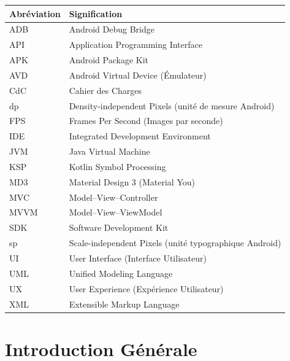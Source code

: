 \documentclass[12pt,a4paper]{report}
\begin{document}
\begin{center}
\begin{tabular}{p{3cm} p{11.5cm}}
\toprule
\textbf{Abr\'eviation} & \textbf{Signification} \\
\midrule
ADB   & Android Debug Bridge \\
API   & Application Programming Interface \\
APK   & Android Package Kit \\
AVD   & Android Virtual Device (\'Emulateur) \\
CdC   & Cahier des Charges \\
dp    & Density-independent Pixels (unit\'e de mesure Android) \\
FPS   & Frames Per Second (Images par seconde) \\
IDE   & Integrated Development Environment \\
JVM   & Java Virtual Machine \\
KSP   & Kotlin Symbol Processing \\
MD3   & Material Design 3 (Material You) \\
MVC   & Model--View--Controller \\
MVVM  & Model--View--ViewModel \\
SDK   & Software Development Kit \\
sp    & Scale-independent Pixels (unit\'e typographique Android) \\
UI    & User Interface (Interface Utilisateur) \\
UML   & Unified Modeling Language \\
UX    & User Experience (Exp\'erience Utilisateur) \\
XML   & Extensible Markup Language \\
\bottomrule
\end{tabular}
\end{center}

\newpage

\setcounter{page}{1}
\pagestyle{fancy}

\chapter*{Introduction G\'en\'erale}
\end{document}
